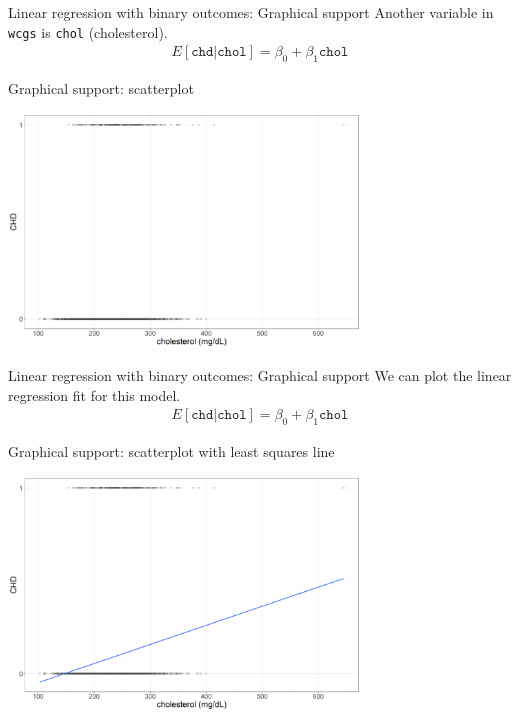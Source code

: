 \documentclass[10pt,t]{beamer}
\begin{document}
\begin{frame}{Linear regression with binary outcomes: Graphical support}
		Another variable in \texttt{wcgs} is \texttt{chol} (cholesterol).
	\begin{align*} 
		E[\texttt{chd}|\texttt{chol}] = \beta_0 + \beta_1 \texttt{chol}  
	\end{align*}
	
	\color{blue} Graphical support: \color{black} scatterplot
	
	\begin{center}
	\includegraphics[width=0.7\textwidth]{./figs/scatter}
	\end{center}
\end{frame}

\begin{frame}{Linear regression with binary outcomes: Graphical support}
	We can plot the linear regression fit for this model.
	\begin{align*} 
		E[\texttt{chd}|\texttt{chol}] = \beta_0 + \beta_1 \texttt{chol}  
	\end{align*}
	
	\color{blue} Graphical support: \color{black} scatterplot with least squares line
	
	\begin{center}
		\includegraphics[width=0.7\textwidth]{./figs/scatter_lm}
	\end{center}
\end{frame}
\end{document}
